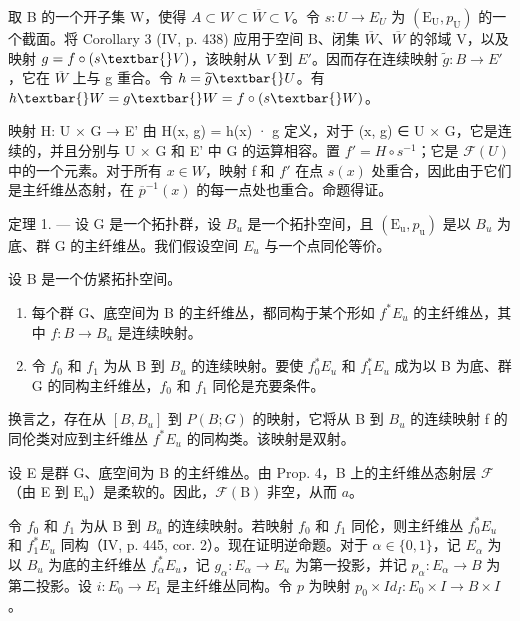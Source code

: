 取 B 的一个开子集 W，使得 \(A \subset W \subset \overline{W} \subset V\)。令 \(s: U \to E_{U}\) 为 \((\mathrm{E}_{\mathrm{U}}, p_{\mathrm{U}})\) 的一个截面。将 Corollary 3 (IV, p. 438) 应用于空间 B、闭集 \(\overline{W}\)、\(\overline{W}\) 的邻域 V，以及映射 \(g = f \circ (s\textbar{} V)\)，该映射从 \(V\) 到 \(E'\)。因而存在连续映射 \(\widetilde{g}: B \to E'\)，它在 \(\overline{W}\) 上与 g 重合。令 \(h = \widetilde{g}\textbar{} U\)。有 \(h\textbar{} W = g\textbar{} W = f \circ (s\textbar{} W)\)。

映射 H: U × G → E' 由 H(x, g) = h(x) · g 定义，对于 (x, g) ∈ U × G，它是连续的，并且分别与 U × G 和 E' 中 G 的运算相容。置 \(f' = H \circ s^{-1}\)；它是 \(\mathcal{F}(U)\) 中的一个元素。对于所有 \(x \in W\)，映射 f 和 \(f'\) 在点 \(s(x)\) 处重合，因此由于它们是主纤维丛态射，在 \(\overline{p}^{-1}(x)\) 的每一点处也重合。命题得证。

定理 1. --- 设 G 是一个拓扑群，设 \(B_{u}\) 是一个拓扑空间，且 \((\mathrm{E}_{\mathrm{u}}, p_{\mathrm{u}})\) 是以 \(B_{u}\) 为底、群 G 的主纤维丛。我们假设空间 \(E_{u}\) 与一个点同伦等价。

设 B 是一个仿紧拓扑空间。

\begin{enumerate}
\def\labelenumi{\alph{enumi})}
\item
每个群 G、底空间为 B 的主纤维丛，都同构于某个形如 \(f^{*}E_{u}\) 的主纤维丛，其中 \(f: B \to B_{u}\) 是连续映射。
\item
令 \(f_{0}\) 和 \(f_{1}\) 为从 B 到 \(B_{u}\) 的连续映射。要使 \(f_{0}^{*}E_{u}\) 和 \(f_{1}^{*}E_{u}\) 成为以 B 为底、群 G 的同构主纤维丛，\(f_{0}\) 和 \(f_{1}\) 同伦是充要条件。
\end{enumerate}

换言之，存在从 \([B, B_{u}]\) 到 \(P(B; G)\) 的映射，它将从 B 到 \(B_{u}\) 的连续映射 f 的同伦类对应到主纤维丛 \(f^{*}E_{u}\) 的同构类。该映射是双射。

设 E 是群 G、底空间为 B 的主纤维丛。由 Prop. 4，B 上的主纤维丛态射层 \(\mathcal{F}\)（由 E 到 \(\mathrm{E_u}\)）是柔软的。因此，\(\mathcal{F}(\mathrm{B})\) 非空，从而 \(a\)。

令 \(f_{0}\) 和 \(f_{1}\) 为从 B 到 \(B_{u}\) 的连续映射。若映射 \(f_{0}\) 和 \(f_{1}\) 同伦，则主纤维丛 \(f_{0}^{*}E_{u}\) 和 \(f_{1}^{*}E_{u}\) 同构（IV, p. 445, cor. 2）。现在证明逆命题。对于 \(\alpha\in\{0,1\}\)，记 \(E_{\alpha}\) 为以 \(B_{u}\) 为底的主纤维丛 \(f_{\alpha}^{*}E_{u}\)，记 \(g_{\alpha} \colon E_{\alpha} \to E_{u}\) 为第一投影，并记 \(p_{\alpha} \colon E_{\alpha} \to B\) 为第二投影。设 \(i \colon E_{0} \to E_{1}\) 是主纤维丛同构。令 \(p\) 为映射 \(p_{0} \times Id_{I} \colon E_{0} \times I \to B \times I\)。

